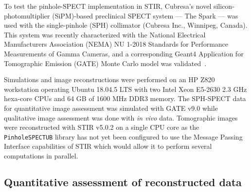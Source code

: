 \documentclass[utf8]{FrontiersinHarvard} %
\begin{document}
To test the pinhole-SPECT implementation in STIR, Cubresa's novel silicon-photomultiplier (SiPM)-based preclinical SPECT system --- The Spark --- was used with the single-pinhole (SPH) collimator (Cubresa Inc., Winnipeg, Canada). This system was recently characterized with the National Electrical Manufacturers Association (NEMA) NU 1-2018 Standards for Performance Measurements of Gamma Cameras, and a corresponding Geant4 Application for Tomographic Emission (GATE) Monte Carlo model was validated~\cite{strugari_nema_2022}.

Simulations and image reconstructions were performed on an HP Z820 workstation operating Ubuntu 18.04.5 LTS with two Intel Xeon E5-2630 2.3 GHz hexa-core CPUs and 64 GB of 1600 MHz DDR3 memory. The SPH-SPECT data for quantitative image assessment was simulated with GATE v9.0 while qualitative image assessment was done with \textit{in vivo} data. Tomographic images were reconstructed with STIR v5.0.2 on a single CPU core as the \texttt{PinholeSPECTUB} library has not yet been configured to use the Message Passing Interface capabilities of STIR which would allow it to perform several computations in parallel.

\subsection{Quantitative assessment of reconstructed data}




\end{document}
